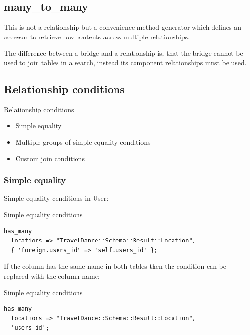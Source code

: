 \subsection{many\_to\_many}

This is not a relationship but a convenience method generator which defines an
accessor to retrieve row contents across multiple relationships.

The difference between a bridge and a relationship is, that the bridge
cannot be used to join tables in a search, instead its component
relationships must be used.

\subsection{Relationship conditions}

\begin{frame}{Relationship conditions}
\begin{itemize}
\item Simple equality
\item Multiple groups of simple equality conditions
\item Custom join conditions
\end{itemize}
\end{frame}

\subsubsection{Simple equality}

Simple equality conditions
in User:

\begin{frame}[fragile]{Simple equality conditions}
\begin{lstlisting}
has_many
  locations => "TravelDance::Schema::Result::Location",
  { 'foreign.users_id' => 'self.users_id' };
\end{lstlisting}
\end{frame}

If the column has the same name in both tables then the condition can be replaced with the column name:

\begin{frame}[fragile]{Simple equality conditions}
\begin{lstlisting}
has_many
  locations => "TravelDance::Schema::Result::Location",
  'users_id';
\end{lstlisting}
\end{frame}

